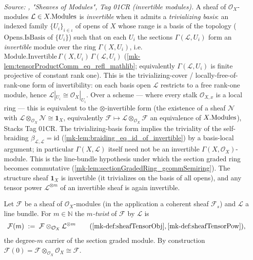 \begin{definition}\label{mk-def:isInvertible}
  \leanok

  \textit{Source: \cite{stacks-project}, "Sheaves of Modules", Tag 01CR (invertible
  modules).}
  A sheaf of \(\mathcal{O}_X\)-modules \(\mathcal{L} \in X.\mathrm{Modules}\) is
  \emph{invertible} when it admits a \emph{trivializing basis}: an indexed family
  \(\{U_i\}_{i \in \iota}\) of opens of \(X\) whose range is a basis of the
  topology (\(\mathrm{Opens.IsBasis}\) of \(\{U_i\}\)) such that on each \(U_i\)
  the sections \(\Gamma(\mathcal{L}, U_i)\) form an \emph{invertible} module over
  the ring \(\Gamma(X, U_i)\), i.e.
  \(\mathrm{Module.Invertible}\,\Gamma(X,U_i)\,\Gamma(\mathcal{L},U_i)\)
  (\ref{mk-lem:tensorProductComm_eq_refl_mathlib}; equivalently
  \(\Gamma(\mathcal{L},U_i)\) is finite projective of constant rank one). This is
  the trivializing-cover / locally-free-of-rank-one form of invertibility: on each
  basis open \(\mathcal{L}\) restricts to a free rank-one module, hence
  \(\mathcal{L}|_{U_i} \cong \mathcal{O}_X|_{U_i}\). Over a scheme --- where every
  stalk \(\mathcal{O}_{X,x}\) is a local ring --- this is equivalent to the
  \(\otimes\)-invertible form (the existence of a sheaf \(\mathcal{N}\) with
  \(\mathcal{L} \otimes_{\mathcal{O}_X} \mathcal{N} \cong \mathbf{1}_X\),
  equivalently \(\mathcal{F} \mapsto \mathcal{L} \otimes_{\mathcal{O}_X}
  \mathcal{F}\) an equivalence of \(X.\mathrm{Modules}\)), Stacks Tag 01CR. The
  trivializing-basis form implies the triviality of the self-braiding
  \(\beta_{\mathcal{L},\mathcal{L}} = \mathrm{id}\)
  (\ref{mk-lem:braiding_eq_id_of_invertible}) by a basis-local argument; in
  particular \(\Gamma(X,\mathcal{L})\) itself need not be an invertible
  \(\Gamma(X,\mathcal{O}_X)\)-module. This is the line-bundle hypothesis under which
  the section graded ring becomes commutative
  (\ref{mk-lem:sectionGradedRing_gcommSemiring}). The structure sheaf \(\mathbf{1}_X\)
  is invertible (it trivializes on the basis of all opens), and any tensor power
  \(\mathcal{L}^{\otimes m}\) of an invertible sheaf is again invertible.
\end{definition}


\begin{definition}\label{mk-def:sheafModuleTwist}
  \leanok

  Let \(\mathcal{F}\) be a sheaf of \(\mathcal{O}_X\)-modules (in the application
  a coherent sheaf \(\mathcal{F}_s\)) and \(\mathcal{L}\) a line bundle. For
  \(m \in \mathbb{N}\) the \emph{\(m\)-twist} of \(\mathcal{F}\) by
  \(\mathcal{L}\) is
  \[
    \mathcal{F}(m) \;:=\;
      \mathcal{F} \otimes_{\mathcal{O}_X} \mathcal{L}^{\otimes m}
      \qquad(\ref{mk-def:sheafTensorObj}, \ref{mk-def:sheafTensorPow}),
  \]
  the degree-\(m\) carrier of the section graded module. By construction
  \(\mathcal{F}(0) = \mathcal{F} \otimes_{\mathcal{O}_X} \mathcal{O}_X \cong
  \mathcal{F}\).
\end{definition}


